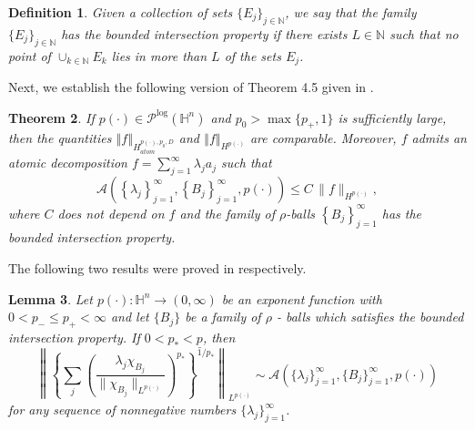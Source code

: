 \documentclass[oneside,10pt]{article}
\newtheorem{theorem}{Theorem}
\newtheorem{definition}[theorem]{Definition}
\newtheorem{lemma}[theorem]{Lemma}
\begin{document}
\begin{definition}
Given a collection of sets $\{ E_j \}_{j \in \mathbb{N}}$, we say that the family $\{ E_j \}_{j \in \mathbb{N}}$ has the bounded intersection property if there exists $L \in \mathbb{N}$ such that no point of $\cup_{k \in \mathbb{N}} E_k$ lies in more than $L$ of the sets $E_j$.
\end{definition}

Next, we establish the following version of Theorem 4.5 given in \cite{Fang}. 

\begin{theorem} \label{var decatomic}
If $p(\cdot) \in \mathcal{P}^{\log}(\mathbb{H}^n)$ and $p_0 > \max\{ p_{+}, 1\}$ is sufficiently large, then the quantities $\left\Vert f\right\Vert_{H_{atom}^{p(\cdot), p_{0}, D}}$ and 
$\left\Vert f\right\Vert _{H^{p(\cdot)}}$ are comparable. Moreover, $f$ admits an atomic decomposition 
$f=\sum\limits_{j=1}^{\infty } \lambda_{j} a_{j}$ such that
\[
\mathcal{A}\left( \left\{ \lambda_{j} \right\}_{j=1}^{\infty },\left\{ B_{j}\right\}_{j=1}^{\infty}, p(\cdot)\right) \leq 
C \, \|f \|_{H^{p(\cdot)}},
\]
where $C$ does not depend on $f$ and the family of $\rho$-balls $\left\{ B_{j}\right\} _{j=1}^{\infty}$ has the bounded intersection property.
\end{theorem}

The following two results were proved in \cite[Lemma 5.7 and Proposition 3.3]{rocha2} respectively.

\begin{lemma} \label{ineq p star}
Let $p(\cdot) : \mathbb{H}^{n} \to (0, \infty)$ be an exponent function with $0 < p_{-} \leq p_{+} < \infty$ and let $\{ B_j \}$ be a family of $\rho$ - balls which satisfies the bounded intersection property. If $0 < p_{*} < \underline{p}$, then
\[
\left\| \left\{ \sum_j \left( \frac{\lambda_j \chi_{B_j}}{\| \chi_{B_j} \|_{L^{p(\cdot)}}} \right)^{p_{*}} \right\}^{1/p_{*}}
\right\|_{L^{p(\cdot)}} \sim \mathcal{A} \left( \{ \lambda_j \}_{j=1}^{\infty}, \{ B_j \}_{j=1}^{\infty}, p(\cdot) \right)
\]
for any sequence of nonnegative numbers $\{ \lambda_j \}_{j=1}^{\infty}$.
\end{lemma}
\end{document}
